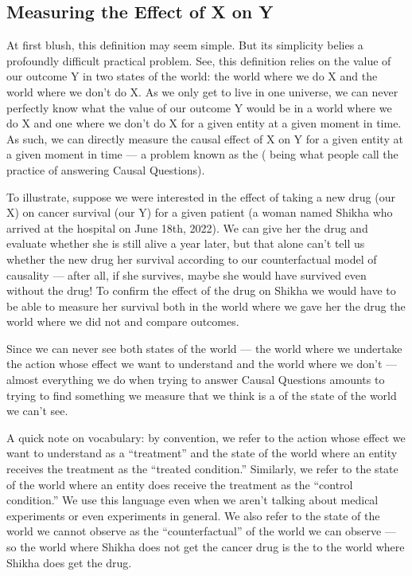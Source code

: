 \documentclass[letterpaper,10pt,english]{jupyterBook}
\begin{document}
\subsection{Measuring the Effect of X on Y}
\label{\detokenize{30_questions/40_answering_causal_questions:measuring-the-effect-of-x-on-y}}
\sphinxAtStartPar
At first blush, this definition may seem simple. But its simplicity belies a profoundly difficult practical problem. See, this definition relies on  the value of our outcome Y in two states of the world: the world where we do X and the world where we don’t do X. As we only get to live in one universe, we can never perfectly know what the value of our outcome Y would be in  a world where we do X and one where we don’t do X for a given entity at a given moment in time. As such, we can  directly measure the causal effect of X on Y for a given entity at a given moment in time — a problem known as the  ( being what people call the practice of answering Causal Questions).

\sphinxAtStartPar
To illustrate, suppose we were interested in the effect of taking a new drug (our X) on cancer survival (our Y) for a given patient (a woman named Shikha who arrived at the hospital on June 18th, 2022). We can give her the drug and evaluate whether she is still alive a year later, but that alone can’t tell us whether the new drug  her survival according to our counterfactual model of causality — after all, if she survives, maybe she would have survived even without the drug! To confirm the effect of the drug on Shikha  we would have to be able to measure her survival both in the world where we gave her the drug  the world where we did not and compare outcomes.

\sphinxAtStartPar
Since we can never see both states of the world — the world where we undertake the action whose effect we want to understand and the world where we don’t — almost everything we do when trying to answer Causal Questions amounts to trying to find something we  measure that we think is a  of the state of the world we can’t see.

\sphinxAtStartPar
A quick note on vocabulary: by convention, we refer to the action whose effect we want to understand as a “treatment” and the state of the world where an entity receives the treatment as the “treated condition.” Similarly, we refer to the state of the world where an entity does  receive the treatment as the “control condition.” We use this language even when we aren’t talking about medical experiments or even experiments in general. We also refer to the state of the world we cannot observe as the “counterfactual” of the world we can observe — so the world where Shikha does not get the cancer drug is the  to the world where Shikha does get the drug.
\end{document}
